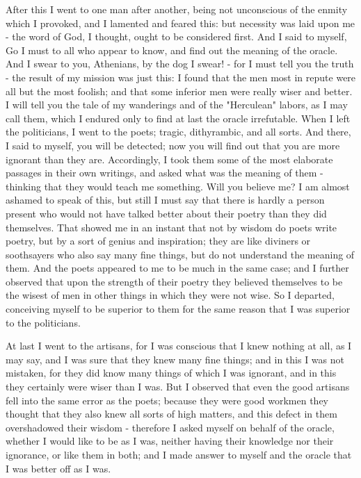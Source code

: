 After this I went to one man after another, being not unconscious
of the enmity which I provoked, and I lamented and feared this: but
necessity was laid upon me - the word of God, I thought, ought to
be considered first. And I said to myself, Go I must to all who appear
to know, and find out the meaning of the oracle. And I swear to you,
Athenians, by the dog I swear! - for I must tell you the truth - the
result of my mission was just this: I found that the men most in repute
were all but the most foolish; and that some inferior men were really
wiser and better. I will tell you the tale of my wanderings and of
the "Herculean" labors, as I may call them, which I endured only to
find at last the oracle irrefutable. When I left the politicians,
I went to the poets; tragic, dithyrambic, and all sorts. And there,
I said to myself, you will be detected; now you will find out that
you are more ignorant than they are. Accordingly, I took them some
of the most elaborate passages in their own writings, and asked what
was the meaning of them - thinking that they would teach me something.
Will you believe me? I am almost ashamed to speak of this, but still
I must say that there is hardly a person present who would not have
talked better about their poetry than they did themselves. That showed
me in an instant that not by wisdom do poets write poetry, but by
a sort of genius and inspiration; they are like diviners or soothsayers
who also say many fine things, but do not understand the meaning of
them. And the poets appeared to me to be much in the same case; and
I further observed that upon the strength of their poetry they believed
themselves to be the wisest of men in other things in which they were
not wise. So I departed, conceiving myself to be superior to them
for the same reason that I was superior to the politicians.

At last I went to the artisans, for I was conscious that I knew nothing
at all, as I may say, and I was sure that they knew many fine things;
and in this I was not mistaken, for they did know many things of which
I was ignorant, and in this they certainly were wiser than I was.
But I observed that even the good artisans fell into the same error
as the poets; because they were good workmen they thought that they
also knew all sorts of high matters, and this defect in them overshadowed
their wisdom - therefore I asked myself on behalf of the oracle, whether
I would like to be as I was, neither having their knowledge nor their
ignorance, or like them in both; and I made answer to myself and the
oracle that I was better off as I was. 

